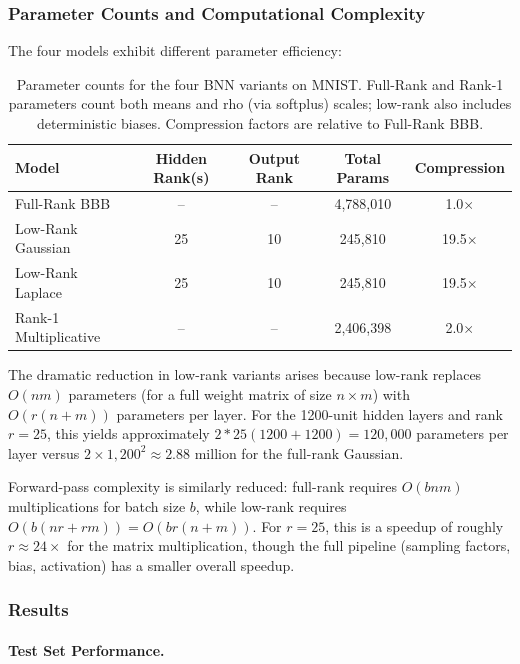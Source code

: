 \documentclass{article}
\theoremstyle{plain}
\theoremstyle{definition}
\theoremstyle{remark}
\begin{document}
\subsubsection{Parameter Counts and Computational Complexity}

The four models exhibit different parameter efficiency:

\begin{table}[h]
\centering
\small
\begin{tabular}{l c c c c}
\toprule
\textbf{Model} & \textbf{Hidden Rank(s)} & \textbf{Output Rank} & \textbf{Total Params} & \textbf{Compression} \\
\midrule
Full-Rank BBB & – & – & 4,788,010 & 1.0$\times$ \\
Low-Rank Gaussian & 25 & 10 & 245,810 & 19.5$\times$ \\
Low-Rank Laplace & 25 & 10 & 245,810 & 19.5$\times$ \\
Rank-1 Multiplicative & – & – & 2,406,398 & 2.0$\times$ \\
\bottomrule
\end{tabular}
\caption{Parameter counts for the four BNN variants on MNIST. Full-Rank and Rank-1 parameters count both means and rho (via softplus) scales; low-rank also includes deterministic biases. Compression factors are relative to Full-Rank BBB.}
\label{tab:param_counts_mnist}
\end{table}
The dramatic reduction in low-rank variants arises because low-rank replaces $O(nm)$ parameters (for a full weight matrix of size $n \times m$) with $O(r(n+m))$ parameters per layer. For the 1200-unit hidden layers and rank $r = 25$, this yields approximately $2*25(1200 + 1200) = 120,000$ parameters per layer versus $2 \times 1,200^2 \approx 2.88$ million for the full-rank Gaussian.

Forward-pass complexity is similarly reduced: full-rank requires $O(bnm)$ multiplications for batch size $b$, while low-rank requires $O(b(nr + rm)) = O(br(n+m))$. For $r = 25$, this is a speedup of roughly $r \approx 24\times$ for the matrix multiplication, though the full pipeline (sampling factors, bias, activation) has a smaller overall speedup.


\subsubsection{Results}

\paragraph{Test Set Performance.}
\end{document}
